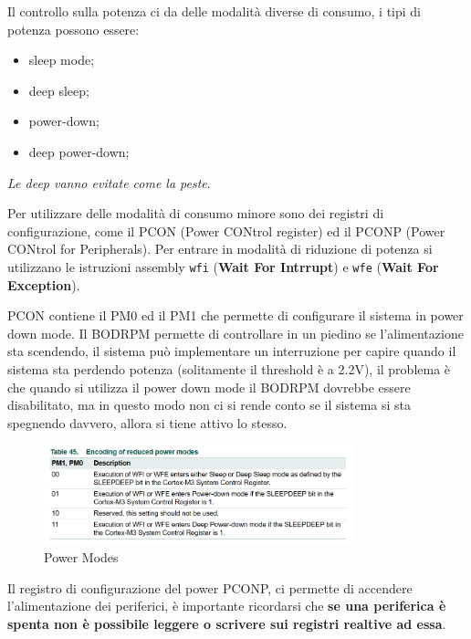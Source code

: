 \documentclass[12pt]{article}
\begin{document}
Il controllo sulla potenza ci da delle modalit\`a diverse di consumo, i tipi di potenza possono essere:
\begin{itemize}
    \item sleep mode;
    \item deep sleep;
    \item power-down;
    \item deep power-down;
\end{itemize}
\emph{Le deep vanno evitate come la peste}.

Per utilizzare delle modalit\`a di consumo minore sono dei registri di configurazione, come il PCON (Power CONtrol register) ed il PCONP (Power CONtrol for Peripherals). Per entrare in modalit\`a di riduzione di potenza si utilizzano le istruzioni assembly \texttt{wfi} (\textbf{Wait For Intrrupt}) e \texttt{wfe} (\textbf{Wait For Exception}).

PCON contiene il PM0 ed il PM1 che permette di configurare il sistema in power down mode. Il BODRPM permette di controllare in un piedino se l'alimentazione sta scendendo, il sistema pu\`o implementare un interruzione per capire quando il sistema sta perdendo potenza (solitamente il threshold \`e a 2.2V), il problema \`e che quando si utilizza il power down mode il BODRPM dovrebbe essere disabilitato, ma in questo modo non ci si rende conto se il sistema si sta spegnendo davvero, allora si tiene attivo lo stesso.
\begin{figure}[H]
    \centering
    \includegraphics[width=0.8\textwidth]{power-modes.png}
    \caption{Power Modes}
    \label{fig:power-modes}
\end{figure}

Il registro di configurazione del power PCONP, ci permette di accendere l'alimentazione dei periferici, \`e importante ricordarsi che \textbf{se una periferica \`e spenta non \`e possibile leggere o scrivere sui registri realtive ad essa}.
\end{document}
